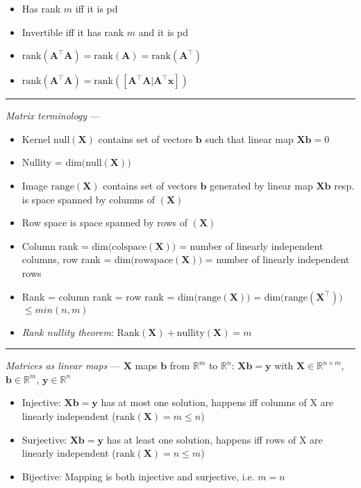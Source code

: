 \begin{multicols}{2}
\begin{itemize}
\begin{itemize}
        \item Has rank $m$ iff it is pd
        \item Invertible iff it has rank $m$ and it is pd
        \item $\textrm{rank}(\boldsymbol{A}^\intercal\boldsymbol{A}) = \textrm{rank}(\boldsymbol{A}) = \textrm{rank}(\boldsymbol{A}^\intercal)$
        \item $\textrm{rank}(\boldsymbol{A}^\intercal\boldsymbol{A}) = \textrm{rank}([\boldsymbol{A}^\intercal\boldsymbol{A} | \boldsymbol{A}^\intercal\boldsymbol{x}])$
    \end{itemize}
\end{itemize}
\end{multicols}

{\color{lightgray}\hrule height 0.001mm}

\emph{Matrix terminology} ---
\begin{itemize}
    \item Kernel $\textrm{null}(\boldsymbol{X})$ contains set of vectors $\boldsymbol{b}$ such that linear map $\boldsymbol{X}\boldsymbol{b} = 0$
    \item Nullity = $\textrm{dim(null}(\boldsymbol{X}))$
    \item Image $\textrm{range}(\boldsymbol{X})$ contains set of vectors $\boldsymbol{b}$ generated by linear map $\boldsymbol{X}\boldsymbol{b}$ resp. is space spanned by columns of $(\boldsymbol{X})$
    \item Row space is space spanned by rows of $(\boldsymbol{X})$ 
    \item Column rank = $\textrm{dim(colspace}(\boldsymbol{X}))$ = number of linearly independent columns, row rank = $\textrm{dim(rowspace}(\boldsymbol{X}))$ = number of linearly independent rows
    \item Rank = column rank = row rank = $\textrm{dim(range}(\boldsymbol{X}))$ = $\textrm{dim(range}(\boldsymbol{X}^\intercal))$ $\leq min(n,m)$
    \item \emph{Rank nullity theorem}: $\textrm{Rank}(\boldsymbol{X}) + \textrm{nullity}(\boldsymbol{X}) = m$
\end{itemize}

{\color{lightgray}\hrule height 0.001mm}

\emph{Matrices as linear maps} ---
$\boldsymbol{X}$ maps $\boldsymbol{b}$ from $\mathbb{R}^m$ to $\mathbb{R}^n$: $\boldsymbol{X}\boldsymbol{b} = \boldsymbol{y}$ with $\boldsymbol{X} \in \mathbb{R}^{n \times m}$, $\boldsymbol{b} \in \mathbb{R}^{m}$, $\boldsymbol{y} \in \mathbb{R}^{n}$
\begin{itemize}
    \item Injective: $\boldsymbol{X}\boldsymbol{b} = \boldsymbol{y}$ has at most one solution, happens iff columns of X are linearly independent ($\textrm{rank}(\boldsymbol{X}) = m \leq n$)
    \item Surjective: $\boldsymbol{X}\boldsymbol{b} = \boldsymbol{y}$ has at least one solution, happens iff rows of X are linearly independent ($\textrm{rank}(\boldsymbol{X}) = n \leq m$)
    \item Bijective: Mapping is both injective and surjective, i.e. $m=n$
\end{itemize}

